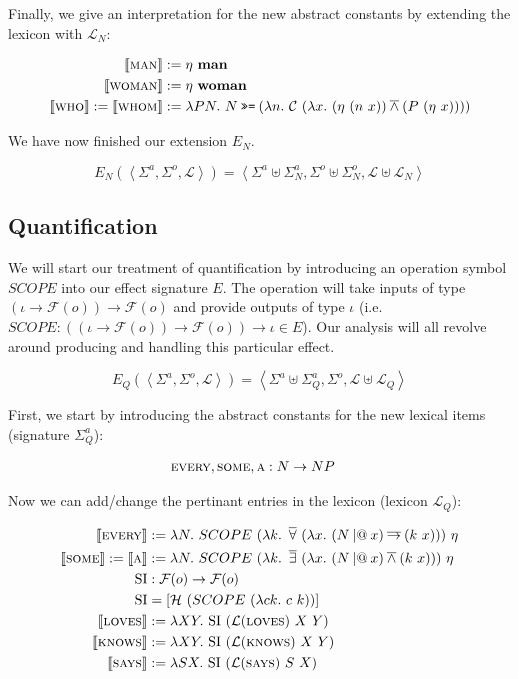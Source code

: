 \documentclass{article}
\makeatletter
\newcommand{\hsbind}{\mathbin{\texttt{>>=}}}
\newcommand{\apl}{\mathbin{|@}}
\newcommand{\abs}[1]{\textsc{#1}}
\newcommand{\obj}[1]{\textbf{#1}}
\newcommand{\sem}[1]{\llbracket #1 \rrbracket}
\newcommand{\lex}[2]{\sem{\abs{#1}} &:= #2}
\newcommand{\dand}{\mathbin{\overline{\land}}}
\newcommand{\dimpl}{\mathbin{\overline{\to}}}
\newcommand{\dexists}{\mathop{\overline{\exists}}}
\newcommand{\dforall}{\mathop{\overline{\forall}}}
\makeatother
\begin{document}
Finally, we give an interpretation for the new abstract constants by
extending the lexicon with $\mathcal{L}_N$:

\begin{align*}
  \lex{man}{\eta\ \obj{man}} \\
  \lex{woman}{\eta\ \obj{woman}} \\
  \sem{\abs{who}} := \sem{\abs{whom}} &:= \lambda P N.\ N \hsbind (\lambda n.\ \mathcal{C}\ (\lambda x.\ (\eta\ (n\ x)) \dand (P\ (\eta\ x))))
\end{align*}

We have now finished our extension $E_N$.

$$
E_N(\left< \Sigma^a, \Sigma^o, \mathcal{L} \right>) = \left< \Sigma^a \uplus
\Sigma^a_N, \Sigma^o \uplus \Sigma^o_N, \mathcal{L} \uplus \mathcal{L}_N \right>
$$


\subsection{Quantification}

We will start our treatment of quantification by introducing an operation
symbol $SCOPE$ into our effect signature $E$. The operation will take
inputs of type $(\iota \to \mathcal{F}(o)) \to \mathcal{F}(o)$ and provide
outputs of type $\iota$ (i.e.\ $SCOPE : ((\iota \to \mathcal{F}(o)) \to
\mathcal{F}(o)) \to \iota \in E$). Our analysis will all revolve around
producing and handling this particular effect.

$$
E_Q(\left< \Sigma^a, \Sigma^o, \mathcal{L} \right>) = \left< \Sigma^a \uplus \Sigma^a_Q, \Sigma^o, \mathcal{L} \uplus \mathcal{L}_Q \right>
$$

First, we start by introducing the abstract constants for the new lexical
items (signature $\Sigma^a_Q$):

\begin{align*}
  \abs{every}, \abs{some}, \abs{a} &: N \to NP
\end{align*}

Now we can add/change the pertinant entries in the lexicon (lexicon $\mathcal{L}_Q$):

\begin{align*}
  \lex{every}{\lambda N.\ SCOPE\ (\lambda k.\ \dforall\ (\lambda x.\ (N \apl x) \dimpl (k\ x)))\ \eta} \\
  \sem{\abs{some}} := \sem{\abs{a}} &:= \lambda N.\ SCOPE\ (\lambda k.\ \dexists\ (\lambda x.\ (N \apl x) \dand (k\ x)))\ \eta \\
  \mathrm{SI} &: \mathcal{F}(o) \to \mathcal{F}(o) \\
  \mathrm{SI} &= [\mathcal{H}\ (SCOPE\ (\lambda c k.\ c\ k))] \\
  \lex{loves}{\lambda X Y.\ \mathrm{SI}\ (\mathcal{L}(\abs{loves})\ X\ Y)} \\
  \lex{knows}{\lambda X Y.\ \mathrm{SI}\ (\mathcal{L}(\abs{knows})\ X\ Y)} \\
  \lex{says}{\lambda S X.\ \mathrm{SI}\ (\mathcal{L}(\abs{says})\ S\ X)} \\
\end{align*}
\end{document}
